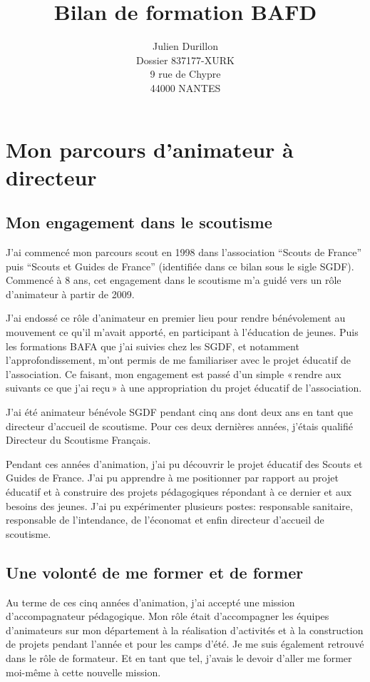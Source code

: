 \documentclass[titlepage,11pt,a4paper]{article}
\title{Bilan de formation BAFD}
\author{Julien Durillon\\Dossier 837177-XURK\\9 rue de Chypre\\44000 NANTES}
\begin{document}
\maketitle

\tableofcontents

\clearpage

\section{Mon parcours d'animateur à directeur}

\subsection{Mon engagement dans le scoutisme}

J'ai commencé mon parcours scout en 1998 dans l'association ``Scouts de France'' puis ``Scouts et Guides
de France'' (identifiée dans ce bilan sous le sigle SGDF). Commencé à 8 ans, cet engagement dans le scoutisme
m'a guidé vers un rôle d'animateur à partir de 2009.

J'ai endossé ce rôle d'animateur en premier lieu pour rendre bénévolement au mouvement ce
qu'il m'avait apporté, en participant à l'éducation de jeunes. Puis les
formations BAFA que j'ai suivies chez les SGDF, et notamment l'approfondissement, m'ont
permis de me familiariser avec le projet éducatif de l'association. Ce faisant, mon
engagement est passé d'un simple «\,rendre aux suivants ce que j'ai reçu\,» à une
appropriation du projet éducatif de l'association.

J'ai été animateur bénévole SGDF pendant cinq ans dont deux ans en tant que directeur
d'accueil de scoutisme. Pour ces deux dernières années, j'étais qualifié Directeur du Scoutisme Français.

Pendant ces années d'animation, j'ai pu découvrir le projet éducatif des
Scouts et Guides de France. J'ai pu apprendre à me positionner par rapport au projet
éducatif et à construire des projets pédagogiques répondant à ce dernier et aux besoins
des jeunes. J'ai pu expérimenter plusieurs postes: responsable sanitaire,
responsable de l'intendance, de l'économat et enfin directeur d'accueil de scoutisme.

\subsection{Une volonté de me former et de former}

Au terme de ces cinq années d'animation, j'ai accepté une mission d’accompagnateur pédagogique.
Mon rôle était d'accompagner les équipes d'animateurs sur mon département à la réalisation
d'activités et à la construction de projets pendant l'année et pour les camps d'été.
Je me suis également retrouvé dans le rôle de formateur. Et en tant que tel, j'avais le
devoir d'aller me former moi-même à cette nouvelle mission.
\end{document}
